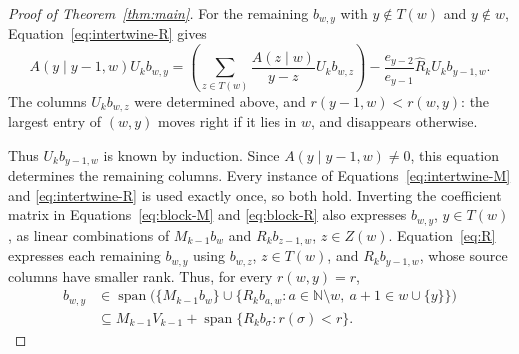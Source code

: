 \documentclass[12pt]{article}
\theoremstyle{plain}
\theoremstyle{definition}
\theoremstyle{remark}
\newcommand{\bN}{\mathbb{N}}
\begin{document}
\begin{proof}[Proof of Theorem~\ref{thm:main}]
For the remaining $b_{w,y}$ with $y\notin T(w)$ and $y\notin w$, Equation~\eqref{eq:intertwine-R} gives
\begin{equation}\label{eq:free-R}
A(y\mid y-1,w)U_kb_{w,y}
 =\left(\sum_{z\in T(w)}\frac{A(z\mid w)}{y-z}U_kb_{w,z}\right)
  -\frac{e_{y-2}}{e_{y-1}}\hat R_kU_kb_{y-1,w}.
\end{equation}
The columns $U_kb_{w,z}$ were determined above, and $r(y-1,w)<r(w,y)$:
the largest entry of $(w,y)$ moves right if it lies in $w$, and disappears otherwise.


Thus $U_kb_{y-1,w}$ is known by induction. Since $A(y\mid y-1,w)\ne0$, this equation determines the remaining columns. Every instance of
Equations~\eqref{eq:intertwine-M} and \eqref{eq:intertwine-R} is used
exactly once, so both hold.
Inverting the coefficient matrix in Equations~\eqref{eq:block-M} and
\eqref{eq:block-R} also expresses $b_{w,y}$, $y\in T(w)$, as linear
combinations of $M_{k-1}b_w$ and $R_kb_{z-1,w}$, $z\in Z(w)$.
Equation~\eqref{eq:R} expresses each remaining $b_{w,y}$ using
$b_{w,z}$, $z\in T(w)$, and $R_kb_{y-1,w}$, whose source columns have
smaller rank. Thus, for every $r(w,y)=r$,
\begin{equation}\label{eq:rank-span}
\begin{aligned}
b_{w,y}&\in\operatorname{span}\bigl(\{M_{k-1}b_w\}
 \cup\{R_kb_{a,w}:a\in\bN\setminus w,\ a+1\in w\cup\{y\}\}\bigr)\\
&\subseteq M_{k-1}V_{k-1}
 +\operatorname{span}\{R_kb_\sigma:r(\sigma)<r\}.
\end{aligned}
\end{equation}


\end{proof}
\end{document}
